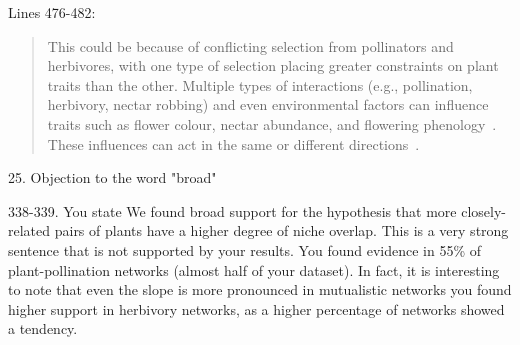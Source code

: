 \documentclass[12pt]{letter}
\newenvironment{refquote}{\bigskip \begin{it}}{\end{it}\smallskip}
\providecommand{\DIFaddbegin}{} %
\newcommand{\DIFaddincludegraphics}[2][]{{\color{blue}\fbox{\DIFOincludegraphics[#1]{#2}}}} %
\DeclareRobustCommand{\DIFaddbegin}{\DIFOaddbegin \let\includegraphics\DIFaddincludegraphics} %
\begin{document}
		Lines 476-482:

		\begin{quotation}

			This could be because of conflicting selection from pollinators and herbivores,
			with one type of selection placing greater constraints on plant traits than the other.
			Multiple types of interactions (e.g., pollination, herbivory, nectar robbing) 
			and even environmental factors can influence traits such as 
			flower colour, nectar abundance, and flowering phenology~\citep{Strauss2006}. 
			These influences can act in the same or different directions~\citep{Strauss2006}.

		\end{quotation}


	25. Objection to the word "broad"

		\begin{refquote}
			338-339. You state We found broad support for the hypothesis that more closely-related pairs of plants have a higher degree of niche overlap. This is a very strong sentence that is not supported by your results. You found evidence in 55\% of plant-pollination networks (almost half of your dataset). In fact, it is interesting to note that even the slope is more pronounced in mutualistic networks you found higher support in herbivory networks, as a higher percentage of networks showed a tendency.
		\end{refquote}


\DIFaddbegin 
\end{document}
